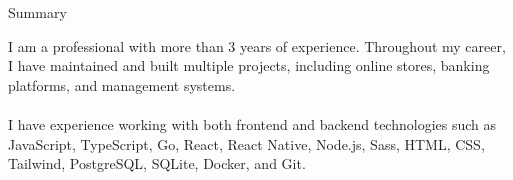 \documentclass[]{mcdowell-cv/mcdowellcv}
\begin{document}
    \makeheader

    \begin{cvsection}{Summary}
        \begin{cvsubsection}{}{}{}
            I am a professional with more than 3 years of experience.
            Throughout my career, I have maintained and built multiple projects, including online stores, banking platforms, and management systems.\\\\
            I have experience working with both frontend and backend technologies such as JavaScript, TypeScript, Go, React, React Native, Node.js, Sass, HTML, CSS, Tailwind, PostgreSQL, SQLite, Docker, and Git.
        \end{cvsubsection}
    \end{cvsection}
\end{document}
